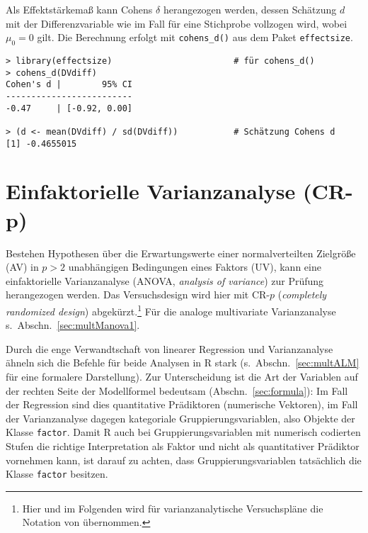 Als Effektstärkemaß kann Cohens $\delta$ herangezogen werden, dessen Schätzung $d$ mit der Differenzvariable wie im Fall für eine Stichprobe vollzogen wird, wobei $\mu_{0} = 0$ gilt. Die Berechnung erfolgt mit \lstinline!cohens_d()! aus dem Paket \lstinline!effectsize!.
\begin{lstlisting}
> library(effectsize)                        # für cohens_d()
> cohens_d(DVdiff)
Cohen's d |        95% CI
-------------------------
-0.47     | [-0.92, 0.00]

> (d <- mean(DVdiff) / sd(DVdiff))           # Schätzung Cohens d
[1] -0.4655015
\end{lstlisting}

\section[Einfaktorielle Varianzanalyse (CR-\texorpdfstring{$p$}{p})]{Einfaktorielle Varianzanalyse (CR-$\bm{p}$)}
\label{sec:CRp}

Bestehen Hypothesen über die Erwartungswerte einer normalverteilten Zielgröße (AV) in $p > 2$ unabhängigen Bedingungen eines Faktors (UV), kann eine einfaktorielle Varianzanalyse (ANOVA, \emph{analysis of variance}) zur Prüfung herangezogen werden. Das Versuchsdesign wird hier mit CR-$p$ (\emph{completely randomized design}) abgekürzt.\footnote{Hier und im Folgenden wird für varianzanalytische Versuchspläne die Notation von  übernommen.} Für die analoge multivariate Varianzanalyse s.\ Abschn.\ \ref{sec:multManova1}.

Durch die enge Verwandtschaft von linearer Regression und Varianzanalyse ähneln sich die Befehle für beide Analysen in R stark (s.\ Abschn.\ \ref{sec:multALM} für eine formalere Darstellung). Zur Unterscheidung ist die Art der Variablen auf der rechten Seite der Modellformel bedeutsam (Abschn.\ \ref{sec:formula}): Im Fall der Regression sind dies quantitative Prädiktoren (numerische Vektoren), im Fall der Varianzanalyse dagegen kategoriale Gruppierungsvariablen, also Objekte der Klasse \lstinline!factor!. Damit R auch bei Gruppierungsvariablen mit numerisch codierten Stufen die richtige Interpretation als Faktor und nicht als quantitativer Prädiktor vornehmen kann, ist darauf zu achten, dass Gruppierungsvariablen tatsächlich die Klasse \lstinline!factor! besitzen.

